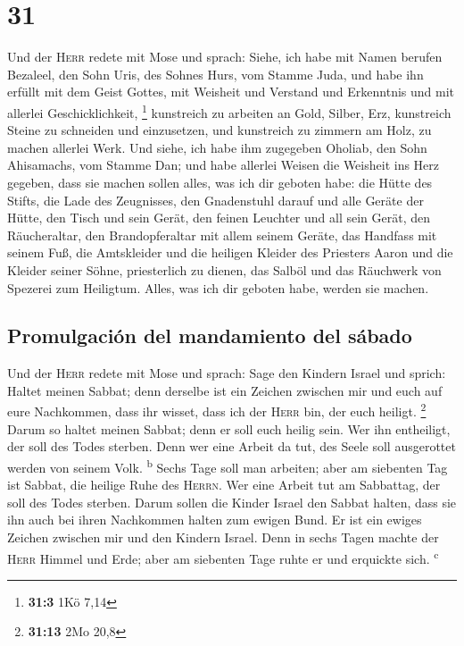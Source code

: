 \hypertarget{section-30}{%
\section{31}\label{section-30}}

 Und der \textsc{Herr} redete mit Mose und sprach:
 Siehe, ich habe mit Namen berufen Bezaleel, den Sohn
Uris, des Sohnes Hurs, vom Stamme Juda,  und habe ihn
erfüllt mit dem Geist Gottes, mit Weisheit und Verstand und Erkenntnis
und mit allerlei Geschicklichkeit, \footnote{\textbf{31:3} 1Kö 7,14}
 kunstreich zu arbeiten an Gold, Silber, Erz,
 kunstreich Steine zu schneiden und einzusetzen, und
kunstreich zu zimmern am Holz, zu machen allerlei Werk. 
Und siehe, ich habe ihm zugegeben Oholiab, den Sohn Ahisamachs, vom
Stamme Dan; und habe allerlei Weisen die Weisheit ins Herz gegeben, dass
sie machen sollen alles, was ich dir geboten habe:  die
Hütte des Stifts, die Lade des Zeugnisses, den Gnadenstuhl darauf und
alle Geräte der Hütte,  den Tisch und sein Gerät, den
feinen Leuchter und all sein Gerät, den Räucheraltar,  den
Brandopferaltar mit allem seinem Geräte, das Handfass mit seinem Fuß,
 die Amtskleider und die heiligen Kleider des Priesters
Aaron und die Kleider seiner Söhne, priesterlich zu dienen,
 das Salböl und das Räuchwerk von Spezerei zum Heiligtum.
Alles, was ich dir geboten habe, werden sie machen.

\hypertarget{promulgaciuxf3n-del-mandamiento-del-suxe1bado}{%
\subsection{Promulgación del mandamiento del
sábado}\label{promulgaciuxf3n-del-mandamiento-del-suxe1bado}}

 Und der \textsc{Herr} redete mit Mose und sprach:
 Sage den Kindern Israel und sprich: Haltet meinen
Sabbat; denn derselbe ist ein Zeichen zwischen mir und euch auf eure
Nachkommen, dass ihr wisset, dass ich der \textsc{Herr} bin, der euch
heiligt. \footnote{\textbf{31:13} 2Mo 20,8}  Darum so
haltet meinen Sabbat; denn er soll euch heilig sein. Wer ihn entheiligt,
der soll des Todes sterben. Denn wer eine Arbeit da tut, des Seele soll
ausgerottet werden von seinem Volk. \textsuperscript{b} 
Sechs Tage soll man arbeiten; aber am siebenten Tag ist Sabbat, die
heilige Ruhe des \textsc{Herrn}. Wer eine Arbeit tut am Sabbattag, der
soll des Todes sterben.  Darum sollen die Kinder Israel
den Sabbat halten, dass sie ihn auch bei ihren Nachkommen halten zum
ewigen Bund.  Er ist ein ewiges Zeichen zwischen mir und
den Kindern Israel. Denn in sechs Tagen machte der \textsc{Herr} Himmel
und Erde; aber am siebenten Tage ruhte er und erquickte sich.
\textsuperscript{c}

